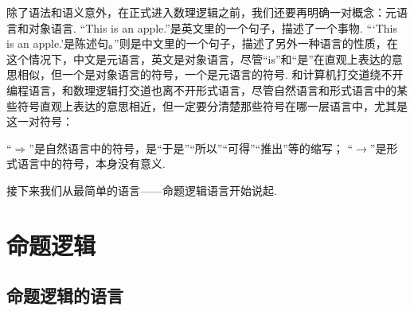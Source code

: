 \vspace{1cm}

除了语法和语义意外，在正式进入数理逻辑之前，我们还要再明确一对概念：元语言和对象语言. “This is an apple.”是英文里的一个句子，描述了一个事物. “‘This is an apple.’是陈述句。”则是中文里的一个句子，描述了另外一种语言的性质，在这个情况下，中文是元语言，英文是对象语言，尽管“is”和“是”在直观上表达的意思相似，但一个是对象语言的符号，一个是元语言的符号. 和计算机打交道绕不开编程语言，和数理逻辑打交道也离不开形式语言，尽管自然语言和形式语言中的某些符号直观上表达的意思相近，但一定要分清楚那些符号在哪一层语言中，尤其是这一对符号：
\begin{reference}
    “\(\Rightarrow\)”是自然语言中的符号，是“于是”“所以”“可得”“推出”等的缩写；\newline
    “\(\rightarrow\)”是形式语言中的符号，本身没有意义.
\end{reference}

接下来我们从最简单的语言——命题逻辑语言开始说起.



\section{命题逻辑}

\subsection{命题逻辑的语言}

